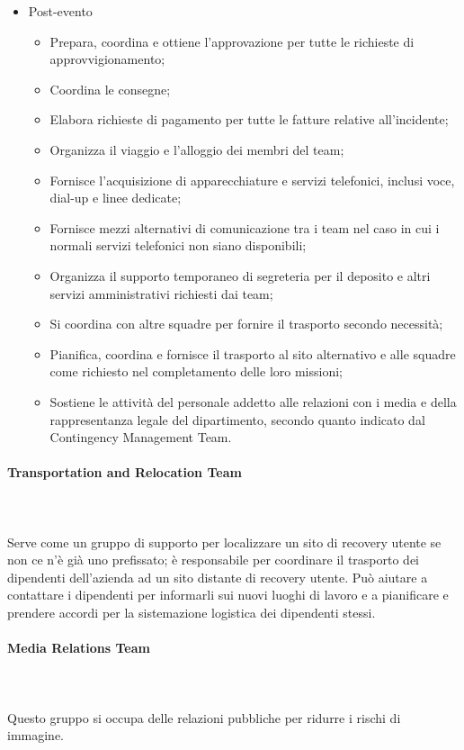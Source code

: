 \documentclass[12pt, a4paper, titlepage]{report}
\newcommand{\myparagraph}[1]{\paragraph{#1}\mbox{} \mbox{}}
\begin{document}
\begin{itemize}
\begin{itemize}
				\end{itemize}
				\item Post-evento
				\begin{itemize}
					\item Prepara, coordina e ottiene l'approvazione per tutte le richieste di approvvigionamento;
					\item Coordina le consegne;
					\item Elabora richieste di pagamento per tutte le fatture relative all'incidente;
					\item Organizza il viaggio e l'alloggio dei membri del team;
					\item Fornisce l'acquisizione di apparecchiature e servizi telefonici, inclusi voce, dial-up e linee dedicate;
					\item Fornisce mezzi alternativi di comunicazione tra i team nel caso in cui i normali servizi telefonici non siano disponibili;
					\item Organizza il supporto temporaneo di segreteria per il deposito e altri servizi amministrativi richiesti dai team;
					\item Si coordina con altre squadre per fornire il trasporto secondo necessità;
					\item Pianifica, coordina e fornisce il trasporto al sito alternativo e alle squadre come richiesto nel completamento delle loro missioni;
					\item Sostiene le attività del personale addetto alle relazioni con i media e della rappresentanza legale del dipartimento, secondo quanto indicato dal Contingency Management Team.
				\end{itemize}
			\end{itemize}		
			
			\myparagraph{Transportation and Relocation Team}\\
			\\Serve come un gruppo di supporto per localizzare un sito di recovery utente se non ce n'è già uno prefissato; è responsabile per coordinare il trasporto dei dipendenti dell'azienda ad un sito distante di recovery utente. Può aiutare a contattare i dipendenti per informarli sui nuovi luoghi di lavoro e a pianificare e prendere accordi per la sistemazione logistica dei dipendenti stessi.
			
			\myparagraph{Media Relations Team}\\		
			\\Questo gruppo si occupa delle relazioni pubbliche per ridurre i rischi di immagine.
			
\end{document}
